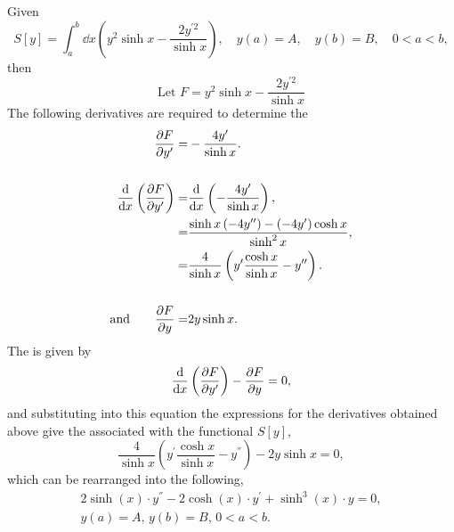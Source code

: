 Given
\[
	S[y] = \int_a^b \dd x\left(y^2\sinh x -\frac{2y^{\prime 2}}{\sinh x}\right),\quad y(a) = A,\quad y(b) = B,\quad 0< a < b,
\]
then
\[
	\textrm{Let } F = y^2\sinh x -\frac{2y^{\prime 2}}{\sinh x}
\]
The following derivatives are required to determine the \el{}
\begin{equation*}
\begin{split}
	\frac{\partial F}{\partial y^\prime} =& -\frac{4y^\prime}{\sinh x}.\\\\
	\frac{\mathrm{d}}{\mathrm{d}x}\left(\frac{\partial F}{\partial y^\prime}\right) =& \frac{\mathrm{d}}{\mathrm{d}x}\left( -\frac{4y^\prime}{\sinh x}\right),\\
	=& \frac{\sinh x\left(-4y^{\prime\prime}\right)-\left(-4y^\prime\right)\cosh x }{\sinh^2x},\\
	=& \frac{4}{\sinh x}\left(y^\prime\frac{\cosh x}{\sinh x}-y^{\prime\prime}\right).\\\\
	\textrm{and}\quad\quad{} \frac{\partial F}{\partial y}=& 2y\sinh x.
\end{split}
\end{equation*}
The \el is given by
\[
	\frac{\mathrm{d}}{\mathrm{d}x}\left(\frac{\partial F}{\partial y^\prime}\right)-\frac{\partial F}{\partial y} = 0,
\]
and substituting into this equation the expressions for the derivatives obtained above give the \el associated with the functional $S[y]$,
\[
	\frac{4}{\sinh x}\left(y^\prime\frac{\cosh x}{\sinh x}-y^\dprime\right) - 2y\sinh x = 0,
\]
which can be rearranged into the following,
\begin{gather*}
	2\sinh(x)\cdot y^\dprime - 2\cosh(x)\cdot y^\prime + \sinh^3(x)\cdot y = 0, \\ 
	y(a) = A,\, y(b) = B,\, 0< a < b.
\end{gather*}